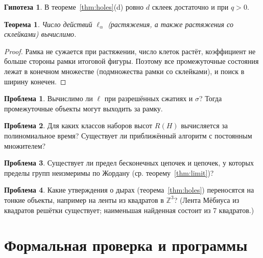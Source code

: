 \documentclass[11pt,a4paper]{article}
\theoremstyle{plain}
\newtheorem{theorem}{Теорема}
\theoremstyle{definition}
\newtheorem{conjecture}{Гипотеза}
\newtheorem{problem}{Проблема}
\theoremstyle{remark}
\newcommand{\Z}{\mathbb{Z}}
\begin{document}
\begin{conjecture}
В теореме~\ref{thm:holes}(d) ровно $d$ склеек достаточно и при $q>0$.
\end{conjecture}

\begin{theorem}\label{thm:dec}
Число действий $\ell_\alpha$ (растяжения, а также растяжения со склейками) вычислимо.
\end{theorem}
\begin{proof}
Рамка не сужается при растяжении, число клеток растёт, коэффициент не больше стороны рамки итоговой фигуры. Поэтому все промежуточные состояния лежат в конечном множестве (подмножества рамки со склейками), и поиск в ширину конечен.
\end{proof}

\begin{problem}
Вычислимо ли $\ell$ при разрешённых сжатиях и $\sigma$? Тогда промежуточные объекты могут выходить за рамку.
\end{problem}

\begin{problem}
Для каких классов наборов высот $R(H)$ вычисляется за полиномиальное время? Существует ли приближённый алгоритм с постоянным множителем?
\end{problem}

\begin{problem}\label{pr:limit}
Существует ли предел бесконечных цепочек и цепочек, у которых пределы групп неизмеримы по Жордану (ср. теорему~\ref{thm:limit})?
\end{problem}

\begin{problem}
Какие утверждения о дырах (теорема~\ref{thm:holes}) переносятся на тонкие объекты, например на ленты из квадратов в $\Z^3$? (Лента Мёбиуса из квадратов решётки существует; наименьшая найденная состоит из 7 квадратов.)
\end{problem}

\section{Формальная проверка и программы}\label{sec:formal}
\end{document}
